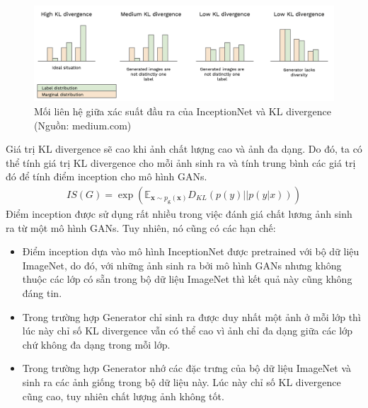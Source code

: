 {    \begin{figure}[H]
    \centering
    \includegraphics[width=13cm] {images/is_kl.png}
    \caption{Mối liên hệ giữa xác suất đầu ra của InceptionNet và KL divergence (Nguồn: medium.com)}
    \label{fig:is_kl}
    \end{figure}
    
    \noindent Giá trị KL divergence sẽ cao khi ảnh chất lượng cao và ảnh đa dạng. Do đó, ta có thể tính giá trị KL divergence cho mỗi ảnh sinh ra và tính trung bình các giá trị đó để tính điểm inception cho mô hình GANs.
    \begin{align}
        IS(G) = \exp(\mathbb{E}_{\bm{x} \sim p_{\bm{g}}(\bm{x})}D_{KL}(p(y)||p(y|x)))
    \end{align}
    Điểm inception được sử dụng rất nhiều trong việc đánh giá chất lương ảnh sinh ra từ một mô hình GANs. Tuy nhiên, nó cũng có các hạn chế:

    \begin{itemize}[leftmargin=0cm,itemindent=.5cm,labelwidth=\itemindent,labelsep=0cm,align=left]
        \item Điểm inception dựa vào mô hình InceptionNet được pretrained với bộ dữ liệu ImageNet, do đó, với những ảnh sinh ra bởi mô hình GANs nhưng không thuộc các lớp có sẵn trong bộ dữ liệu ImageNet thì kết quả này cũng không đáng tin.
        \item Trong trường hợp Generator chỉ sinh ra được duy nhất một ảnh ở mỗi lớp thì lúc này chỉ số KL divergence vẫn có thể cao vì ảnh chỉ đa dạng giữa các lớp chứ không đa dạng trong mỗi lớp.
        \item Trong trường hợp Generator nhớ các đặc trưng của bộ dữ liệu ImageNet và sinh ra các ảnh giống trong bộ dữ liệu này. Lúc này chỉ số KL divergence cũng cao, tuy nhiên chất lượng ảnh không tốt.
    \end{itemize}
    
}
